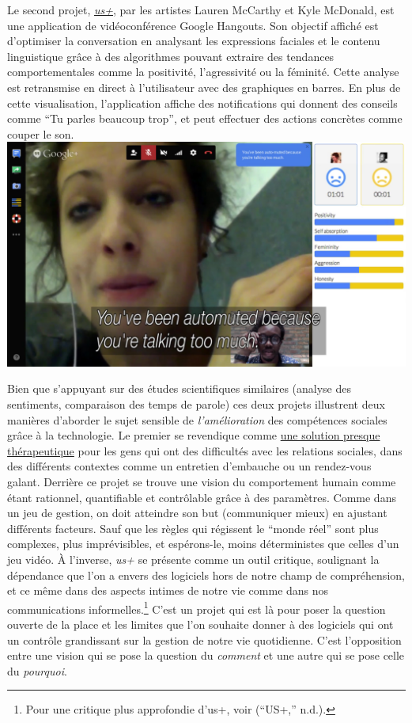 \documentclass[]{article}
\begin{document}
Le second projet, \href{http://lauren-mccarthy.com/us}{\emph{us+}}, par
les artistes Lauren McCarthy et Kyle McDonald, est une application de
vidéoconférence Google Hangouts. Son objectif affiché est d'optimiser la
conversation en analysant les expressions faciales et le contenu
linguistique grâce à des algorithmes pouvant extraire des tendances
comportementales comme la positivité, l'agressivité ou la féminité.
Cette analyse est retransmise en direct à l'utilisateur avec des
graphiques en barres. En plus de cette visualisation, l'application
affiche des notifications qui donnent des conseils comme ``Tu parles
beaucoup trop'', et peut effectuer des actions concrètes comme couper le
son.
\includegraphics{./tex2pdf.9048/8a1224117ed91d8015226843bec5d97f13330fe4.jpg}

Bien que s'appuyant sur des études scientifiques similaires (analyse des
sentiments, comparaison des temps de parole) ces deux projets illustrent
deux manières d'aborder le sujet sensible de \emph{l'amélioration} des
compétences sociales grâce à la technologie. Le premier se revendique
comme \href{(https://www.youtube.com/watch?v=l3ztu9shfMg)}{une solution
presque thérapeutique} pour les gens qui ont des difficultés avec les
relations sociales, dans des différents contextes comme un entretien
d'embauche ou un rendez-vous galant. Derrière ce projet se trouve une
vision du comportement humain comme étant rationnel, quantifiable et
contrôlable grâce à des paramètres. Comme dans un jeu de gestion, on
doit atteindre son but (communiquer mieux) en ajustant différents
facteurs. Sauf que les règles qui régissent le ``monde réel'' sont plus
complexes, plus imprévisibles, et espérons-le, moins déterministes que
celles d'un jeu vidéo. À l'inverse, \emph{us+} se présente comme un
outil critique, soulignant la dépendance que l'on a envers des logiciels
hors de notre champ de compréhension, et ce même dans des aspects
intimes de notre vie comme dans nos communications
informelles.\footnote{Pour une critique plus approfondie d'us+, voir
  (``US+,'' n.d.).} C'est un projet qui est là pour poser la question
ouverte de la place et les limites que l'on souhaite donner à des
logiciels qui ont un contrôle grandissant sur la gestion de notre vie
quotidienne. C'est l'opposition entre une vision qui se pose la question
du \emph{comment} et une autre qui se pose celle du \emph{pourquoi}.
\end{document}
